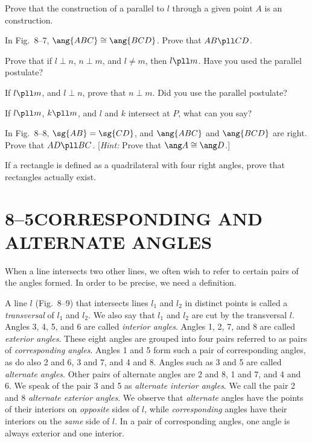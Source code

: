 \documentclass[11pt]{book}
\theoremstyle{bkplain}
\theoremstyle{XIplainnote}
\theoremstyle{bkplain}
\theoremstyle{bkplain}
\begin{document}
\begin{exercisecols}
\begin{exlist}
\item Prove that the construction of a parallel to $l$ through a given point
  $A$ is an \RC{} construction.
\item In Fig.~8--7, $\ang{ABC} \cong \ang{BCD}$. Prove that $AB \pll CD$.
\exfig{\FIGVIIISEVEN}
\item Prove that if $l \perp n$, $n \perp m$, and $l \neq m$, then
  $l \pll m$. Have you used the parallel postulate?
\item If $l \pll m$, and $l \perp n$, prove that $n \perp m$. Did you use the
  parallel postulate?
\item If $l \pll m$, $k \pll m$, and $l$ and $k$ intersect at $P$, what can
  you say?
\item[\stex 6.] In Fig.~8--8, $\sg{AB} = \sg{CD}$, and $\ang{ABC}$ and
  $\ang{BCD}$ are right. Prove that $AD \pll BC$. [\emph{Hint:} Prove that
  $\ang A \cong \ang D$.]
\exfig{\FIGVIIIEIGHT}
\item[\stex 7.] If a rectangle is defined as a quadrilateral with four right
  angles, prove that rectangles actually exist.
\end{exlist}
\end{exercisecols}

\section*{8--5\quad CORRESPONDING AND\\ALTERNATE ANGLES}

When a line intersects two other lines, we often wish to refer to certain
pairs of the angles formed. In order to be precise, we need a definition.

\begin{definition}
A line $l$ (Fig.~8--9) that intersects lines $l_1$ and $l_2$ in distinct
points is called a \emph{transversal} of $l_1$ and $l_2$. We also say that
$l_1$ and $l_2$ are cut by the transversal $l$. Angles 3, 4, 5, and 6 are
called \emph{interior angles}. Angles 1, 2, 7, and 8 are called \emph{exterior
angles}. These eight angles are grouped into four pairs referred to as pairs
of \emph{corresponding angles}. Angles 1 and 5 form such a pair of
corresponding angles, as do also 2 and 6, 3 and 7, and 4 and 8. Angles such as
3 and 5 are called \emph{alternate angles}. Other pairs of alternate angles
are 2 and 8, 1 and 7, and 4 and 6. We speak of the pair 3 and 5 as
\emph{alternate interior angles}. We call the pair 2 and 8 \emph{alternate
exterior angles}. We observe that \emph{alternate} angles have the points of
their interiors on \emph{opposite} sides of $l$, while \emph{corresponding}
angles have their interiors on the \emph{same} side of $l$. In a pair of
corresponding angles, one angle is always exterior and one interior.
\end{definition}
\end{document}
